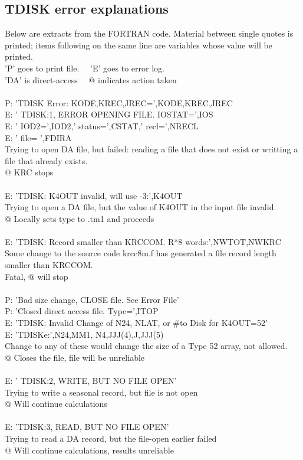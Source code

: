 \documentclass{article}
\newcommand{\qi}{\\ \hspace*{2.em}}      %
\newcommand{\qii}{\\ \hspace*{4.em}}     %
\begin{document}
\subsection{TDISK error explanations \label{edisk} } %
Below are extracts from the FORTRAN code. Material between single quotes is printed; items following on the same line are variables whose value will be printed. 
\qi 'P' goes to print file. \ \ 'E' goes to error log.
\qi 'DA'  is direct-access \ \  @ indicates action taken
\\ 
\\ P: 'TDISK Error:  KODE,KREC,JREC=',KODE,KREC,JREC
\\ E:  ' TDISK:1, ERROR OPENING FILE. IOSTAT=',IOS
\\ E:   '  IOD2=',IOD2,'  status=',CSTAT,'  recl=',NRECL
\\ E:   '  file=  ',FDIRA
\qii  Trying to open DA file, but failed: reading a file that does not exist or writting a file that already exists.
\qii @ KRC stops
\\ 
\\ E: 'TDISK: K4OUT invalid, will use -3:',K4OUT
\qi Trying to open a DA file, but the value of K4OUT in the input file invalid.
\qii  @ Locally sets type to .tm1 and proceeds
\\ 
\\ E: 'TDISK: Record smaller than KRCCOM. R*8 words:',NWTOT,NWKRC
\qi Some change to the source code krcc8m.f has generated a file record length smaller than KRCCOM. 
\qii Fatal, @ will stop
\\ 
\\ P:  'Bad size change, CLOSE file. See Error File'
\\ P: 'Closed direct access file. Type=',ITOP
\\ E: 'TDISK: Invalid Change of N24, NLAT, or \#to Disk for K4OUT=52'
\\ E: 'TDISKe:',N24,MM1, N4,JJJ(4),J,JJJ(5)
\qi Change to any of these would change the size of a Type 52 array, not allowed.
\qii @  Closes the file, file will be unreliable
\\ 
\\ E:  ' TDISK:2, WRITE, BUT NO FILE OPEN'
\qi   Trying to write a seasonal record, but file is not open
\qii @ Will continue calculations
\\ 
\\ E: 'TDISK:3, READ, BUT NO FILE OPEN'
\qi Trying to read a DA record, but the file-open earlier failed 
\qii @ Will continue calculations, results unreliable  
\\ 
\end{document}
